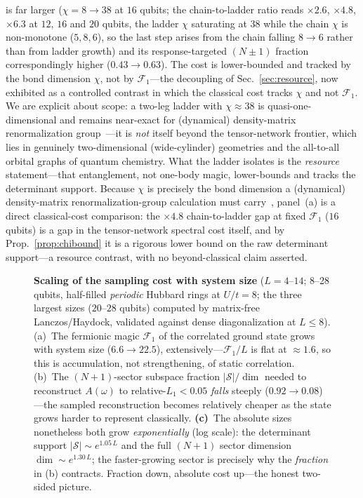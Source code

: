 is far larger ($\chi=8\to38$ at $16$ qubits; the chain-to-ladder ratio reads $\times2.6$, $\times4.8$, $\times6.3$
at $12$, $16$ and $20$ qubits, the ladder $\chi$ saturating at $38$ while the chain $\chi$ is non-monotone ($5,8,6$), so the last step arises from the chain falling $8\to6$ rather than from ladder growth) and its response-targeted $(N{\pm}1)$ fraction correspondingly higher
($0.43\to0.63$). The cost is lower-bounded and tracked by the bond dimension $\chi$, not by $\mathcal F_1$---the
decoupling of Sec.~\ref{sec:resource}, now exhibited as a controlled contrast in which the classical cost
tracks $\chi$ and not $\mathcal F_1$. We are explicit about scope: a two-leg ladder with
$\chi\!\approx\!38$ is quasi-one-dimensional and remains near-exact for (dynamical) density-matrix
renormalization group~\cite{paeckel2019,jeckelmann2002}---it is \emph{not} itself beyond the tensor-network
frontier, which lies in genuinely two-dimensional (wide-cylinder) geometries and the all-to-all orbital
graphs of quantum chemistry. What the ladder isolates is the \emph{resource} statement---that entanglement,
not one-body magic, lower-bounds and tracks the determinant support. Because $\chi$ is precisely the bond dimension a
(dynamical) density-matrix renormalization-group calculation must carry~\cite{paeckel2019,jeckelmann2002},
panel~(a) is a direct classical-cost comparison: the $\times4.8$ chain-to-ladder gap at fixed
$\mathcal F_1$ ($16$ qubits) is a gap in the tensor-network spectral cost itself, and by Prop.~\ref{prop:chibound}
it is a rigorous lower bound on the raw determinant support---a resource contrast, with no
beyond-classical claim asserted.

\begin{figure}[htbp]\centering
\caption{\textbf{Scaling of the sampling cost with system size} ($L=4$--$14$; 8--28 qubits, half-filled
\emph{periodic} Hubbard rings at $U/t=8$; the three largest sizes ($20$--$28$ qubits) computed by matrix-free
Lanczos/Haydock, validated against dense diagonalization at $L\le8$). (a)~The fermionic magic $\mathcal F_1$ of the
correlated ground state grows with system size ($6.6\to22.5$), extensively---$\mathcal F_1/L$ is flat at
$\approx\!1.6$, so this is accumulation, not strengthening, of static correlation. (b)~The $(N{+}1)$-sector subspace fraction
$|\mathcal S|/\dim$ needed to reconstruct $A(\omega)$ to relative-$L_1<0.05$ \emph{falls} steeply
($0.92\to0.08$)---the sampled reconstruction becomes relatively cheaper as the state grows
harder to represent classically. \textbf{(c)}~The absolute sizes nonetheless both grow
\emph{exponentially} (log scale): the determinant support $|\mathcal S|\sim e^{1.05\,L}$ and the full
$(N{+}1)$ sector dimension $\dim\sim e^{1.30\,L}$; the faster-growing sector is precisely why the
\emph{fraction} in (b) contracts. Fraction down, absolute cost up---the honest two-sided
picture.}\label{fig:scaling}\end{figure}

